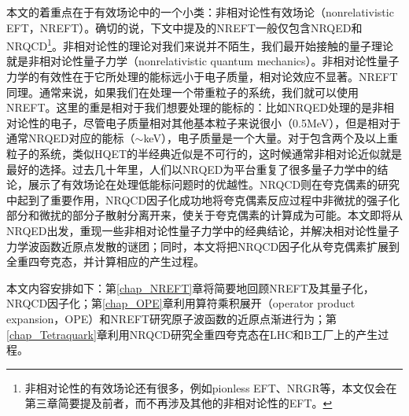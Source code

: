 本文的着重点在于有效场论中的一个小类：非相对论性有效场论（nonrelativistic EFT，NREFT）。确切的说，下文中提及的NREFT一般仅包含NRQED和NRQCD\footnote{非相对论性的有效场论还有很多，例如pionless EFT、NRGR等，本文仅会在第三章简要提及前者，而不再涉及其他的非相对论性的EFT。}。非相对论性的理论对我们来说并不陌生，我们最开始接触的量子理论就是非相对论性量子力学（nonrelativistic quantum mechanics）。非相对论性量子力学的有效性在于它所处理的能标远小于电子质量，相对论效应不显著。NREFT同理。通常来说，如果我们在处理一个带重粒子的系统，我们就可以使用NREFT。这里的重是相对于我们想要处理的能标的：比如NRQED处理的是非相对论性的电子，尽管电子质量相对其他基本粒子来说很小（0.5MeV），但是相对于通常NRQED对应的能标（$\sim$keV），电子质量是一个大量。对于包含两个及以上重粒子的系统，类似HQET的半经典近似是不可行的，这时候通常非相对论近似就是最好的选择。过去几十年里，人们以NRQED为平台重复了很多量子力学中的结论\cite{Pineda1998}，展示了有效场论在处理低能标问题时的优越性。NRQCD则在夸克偶素的研究中起到了重要作用，NRQCD因子化成功地将夸克偶素反应过程中非微扰的强子化部分和微扰的部分子散射分离开来，使关于夸克偶素的计算成为可能。本文即将从NRQED出发，重现一些非相对论性量子力学中的经典结论，并解决相对论性量子力学波函数近原点发散的谜团；同时，本文将把NRQCD因子化从夸克偶素扩展到全重四夸克态，并计算相应的产生过程。

本文内容安排如下：第\ref{chap_NREFT}章将简要地回顾NREFT及其量子化，NRQCD因子化；第\ref{chap_OPE}章利用算符乘积展开（operator product expansion，OPE）和NREFT研究原子波函数的近原点渐进行为；第\ref{chap_Tetraquark}章利用NRQCD研究全重四夸克态在LHC和B工厂上的产生过程。